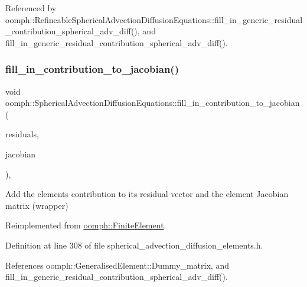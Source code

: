 Referenced by oomph\+::\+Refineable\+Spherical\+Advection\+Diffusion\+Equations\+::fill\+\_\+in\+\_\+generic\+\_\+residual\+\_\+contribution\+\_\+spherical\+\_\+adv\+\_\+diff(), and fill\+\_\+in\+\_\+generic\+\_\+residual\+\_\+contribution\+\_\+spherical\+\_\+adv\+\_\+diff().

\mbox{\label{classoomph_1_1SphericalAdvectionDiffusionEquations_a9ed67207accc327c4d2bf614c4c452e0}} 
\subsubsection{\texorpdfstring{fill\+\_\+in\+\_\+contribution\+\_\+to\+\_\+jacobian()}{fill\_in\_contribution\_to\_jacobian()}}
{\footnotesize\ttfamily void oomph\+::\+Spherical\+Advection\+Diffusion\+Equations\+::fill\+\_\+in\+\_\+contribution\+\_\+to\+\_\+jacobian (\begin{DoxyParamCaption}\item[{\hyperlink{classoomph_1_1Vector}{Vector}$<$ double $>$ \&}]{residuals,  }\item[{\hyperlink{classoomph_1_1DenseMatrix}{Dense\+Matrix}$<$ double $>$ \&}]{jacobian }\end{DoxyParamCaption})\hspace{0.3cm}{\ttfamily [inline]}, {\ttfamily [virtual]}}



Add the element\textquotesingle{}s contribution to its residual vector and the element Jacobian matrix (wrapper) 



Reimplemented from \hyperlink{classoomph_1_1FiniteElement_a0ae7af222af38a0d53bf283dc85bdfea}{oomph\+::\+Finite\+Element}.



Definition at line 308 of file spherical\+\_\+advection\+\_\+diffusion\+\_\+elements.\+h.



References oomph\+::\+Generalised\+Element\+::\+Dummy\+\_\+matrix, and fill\+\_\+in\+\_\+generic\+\_\+residual\+\_\+contribution\+\_\+spherical\+\_\+adv\+\_\+diff().

